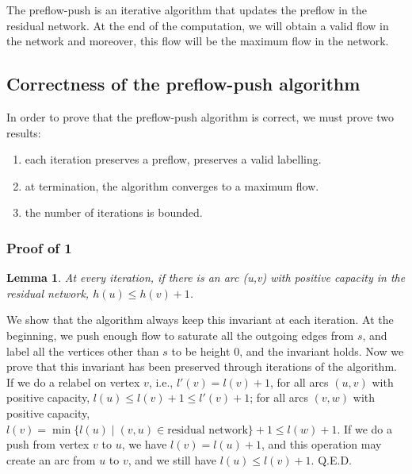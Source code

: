 \documentclass{article}
\newtheorem{lemma}{Lemma}
\newcommand{\QED}{\hfill\hbox{\sf Q.E.D.}}
\newenvironment{proof}{\noindent {\bf Proof:}}{{\QED}\\ \vspace{-.1in}}
\begin{document}
The preflow-push is an iterative algorithm that updates the preflow in the
residual network. At the end of the computation, we will obtain a valid flow in
the network and moreover, this flow will be the maximum flow in the network.

\subsection*{Correctness of the preflow-push algorithm}
In order to prove that the preflow-push algorithm is correct, we must
prove two results:
\begin{enumerate}
  \itemsep 0pt
  \item
    each iteration preserves a preflow, preserves a valid labelling.
  \item
    at termination, the algorithm converges to a maximum flow.
  \item
    the number of iterations is bounded.
\end{enumerate}

\subsubsection*{Proof of 1}
\begin{lemma}
At every iteration, if there is an arc (u,v) with positive capacity in the residual network, $h(u) \leq h(v)+1$.
\end{lemma}
\begin{proof}
We show that the algorithm always keep this invariant at each iteration.
At the beginning, we push enough flow to saturate all the outgoing edges from $s$, 
and label all the vertices other than $s$ to be height $0$, and the invariant holds. 
Now we prove that this invariant has been preserved through iterations of the algorithm.  
If we do a relabel on vertex $v$, i.e., $l'(v)=l(v)+1$, 
for all arcs $(u,v)$ with positive capacity, $l(u) \leq l(v)+1 \leq l'(v)+1$; 
for all arcs $(v,w)$ with positive capacity, $l(v)= \min\{ l(u)\mid(v,u)\in\text{residual network}\} + 1 \leq l(w)+1$. 
If we do a push from vertex $v$ to $u$, we have $l(v) = l(u)+1$, 
and this operation may create an arc from $u$ to $v$, and we still have $l(u) \leq l(v)+1$. 
\end{proof}
\end{document}

